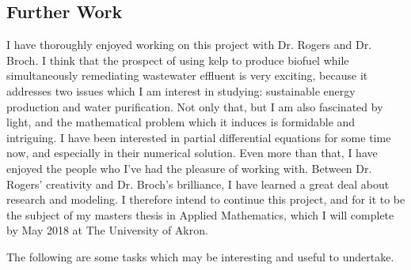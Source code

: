 \documentclass[10pt]{article}
\begin{document}
\begin{multicols}{2}
\section{Further Work}
I have thoroughly enjoyed working on this project with Dr. Rogers and Dr. Broch.
I think that the prospect of using kelp to produce biofuel while simultaneously remediating wastewater effluent is very exciting, because it addresses two issues which I am interest in studying: sustainable energy production and water purification.
Not only that, but I am also fascinated by light, and the mathematical problem which it induces is formidable and intriguing.
I have been interested in partial differential equations for some time now, and especially in their numerical solution.
Even more than that, I have enjoyed the people who I've had the pleasure of working with.
Between Dr. Rogers' creativity and Dr. Broch's brilliance, I have learned a great deal about research and modeling.
I therefore intend to continue this project, and for it to be the subject of my masters thesis in Applied Mathematics, which I will complete by May 2018 at The University of Akron.

The following are some tasks which may be interesting and useful to undertake.


\end{multicols}
\end{document}

